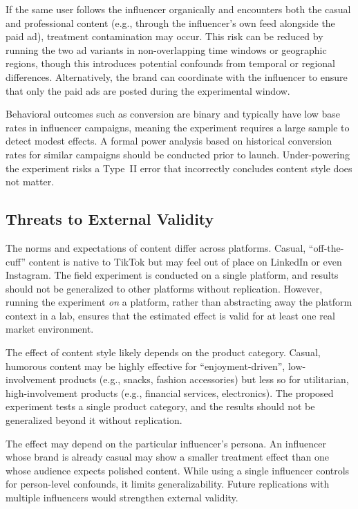 \documentclass[10pt]{article}
\begin{document}
If the same user follows the influencer organically and encounters both the casual and professional content (e.g., through the influencer's own feed alongside the paid ad), treatment contamination may occur. This risk can be reduced by running the two ad variants in non-overlapping time windows or geographic regions, though this introduces potential confounds from temporal or regional differences. Alternatively, the brand can coordinate with the influencer to ensure that only the paid ads are posted during the experimental window.

Behavioral outcomes such as conversion are binary and typically have low base rates in influencer campaigns, meaning the experiment requires a large sample to detect modest effects. A formal power analysis based on historical conversion rates for similar campaigns should be conducted prior to launch. Under-powering the experiment risks a Type~II error that incorrectly concludes content style does not matter.

\subsection{Threats to External Validity}

The norms and expectations of content differ across platforms. Casual, ``off-the-cuff'' content is native to TikTok but may feel out of place on LinkedIn or even Instagram. The field experiment is conducted on a single platform, and results should not be generalized to other platforms without replication. However, running the experiment \textit{on} a platform, rather than abstracting away the platform context in a lab, ensures that the estimated effect is valid for at least one real market environment.

The effect of content style likely depends on the product category. Casual, humorous content may be highly effective for ``enjoyment-driven'', low-involvement products (e.g., snacks, fashion accessories) but less so for utilitarian, high-involvement products (e.g., financial services, electronics). The proposed experiment tests a single product category, and the results should not be generalized beyond it without replication.

The effect may depend on the particular influencer's persona. An influencer whose brand is already casual may show a smaller treatment effect than one whose audience expects polished content. While using a single influencer controls for person-level confounds, it limits generalizability. Future replications with multiple influencers would strengthen external validity.
\end{document}

